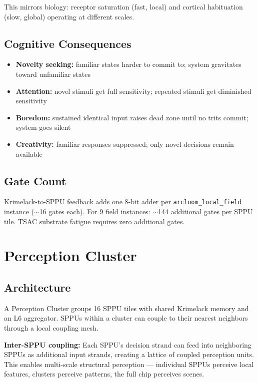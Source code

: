 \documentclass[11pt, a4paper]{article}
\begin{document}
This mirrors biology: receptor saturation (fast, local) and cortical
habituation (slow, global) operating at different scales.

\subsection{Cognitive Consequences}

\begin{itemize}[nosep]
  \item \textbf{Novelty seeking:} familiar states harder to commit to;
        system gravitates toward unfamiliar states
  \item \textbf{Attention:} novel stimuli get full sensitivity; repeated
        stimuli get diminished sensitivity
  \item \textbf{Boredom:} sustained identical input raises dead zone until
        no trits commit; system goes silent
  \item \textbf{Creativity:} familiar responses suppressed; only novel
        decisions remain available
\end{itemize}

\subsection{Gate Count}

Krimelack-to-SPPU feedback adds one 8-bit adder per
\texttt{arcloom\_local\_field} instance ($\sim$16 gates each).
For 9 field instances: $\sim$144 additional gates per SPPU tile.
TSAC substrate fatigue requires zero additional gates.

\section{Perception Cluster}

\subsection{Architecture}

A Perception Cluster groups 16 SPPU tiles with shared Krimelack
memory and an L6 aggregator. SPPUs within a cluster can couple
to their nearest neighbors through a local coupling mesh.

\textbf{Inter-SPPU coupling:} Each SPPU's decision strand can
feed into neighboring SPPUs as additional input strands, creating
a lattice of coupled perception units. This enables multi-scale
structural perception — individual SPPUs perceive local features,
clusters perceive patterns, the full chip perceives scenes.
\end{document}

